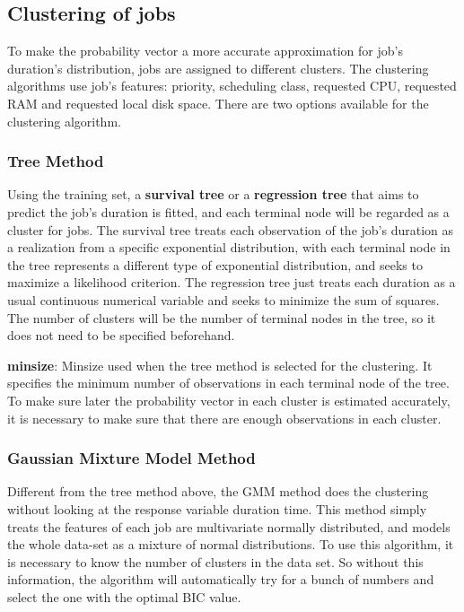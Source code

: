 \documentclass{article}
\begin{document}
\subsection{Clustering of jobs}

\begin{flushleft}
To make the probability vector a more accurate approximation for job's duration's distribution, jobs are assigned to different clusters. The clustering algorithms use job's features: priority, scheduling class, requested CPU, requested RAM and requested local disk space. There are two options available for the clustering algorithm.
\end{flushleft}

\subsubsection{Tree Method}

\begin{flushleft}
Using the training set, a \textbf{survival tree} or a \textbf{regression tree} that aims to predict the job's duration is fitted, and each terminal node will be regarded as a cluster for jobs. The survival tree treats each observation of the job's duration as a realization from a specific exponential distribution, with each terminal node in the tree represents a different type of exponential distribution, and seeks to maximize a likelihood criterion. The regression tree just treats each duration as a usual continuous numerical variable and seeks to minimize the sum of squares. The number of clusters will be the number of terminal nodes in the tree, so it does not need to be specified beforehand.
\end{flushleft}

\begin{flushleft}
\textbf{minsize}: Minsize used when the tree method is selected for the clustering. It specifies the minimum number of observations in each terminal node of the tree. To make sure later the probability vector in each cluster is estimated accurately, it is necessary to make sure that there are enough observations in each cluster.
\end{flushleft}

\subsubsection{Gaussian Mixture Model Method}

\begin{flushleft}
Different from the tree method above, the GMM method does the clustering without looking at the response variable duration time. This method simply treats the features of each job are multivariate normally distributed, and models the whole data-set as a mixture of normal distributions. To use this algorithm, it is necessary to know the number of clusters in the data set. So without this information, the algorithm will automatically try for a bunch of numbers and select the one with the optimal BIC value.
\end{flushleft}
\end{document}
